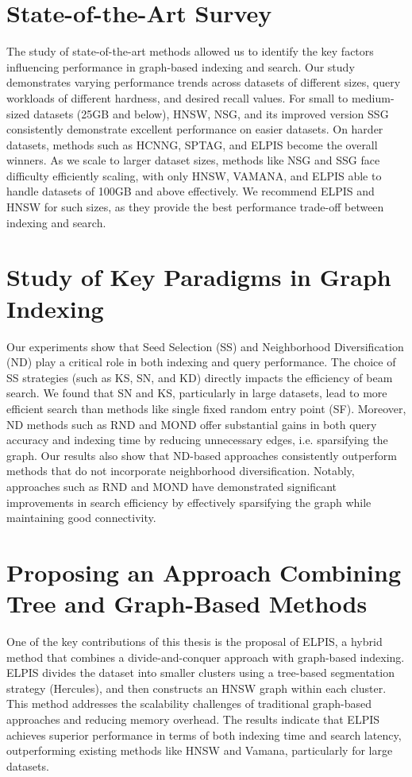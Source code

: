 \section{State-of-the-Art Survey}
The study of state-of-the-art methods allowed us to identify the key factors influencing performance in graph-based indexing and search. Our study demonstrates varying performance trends across datasets of different sizes, query workloads of different hardness, and desired recall values. For small to medium-sized datasets (25GB and below), HNSW, NSG, and its improved version SSG consistently demonstrate excellent performance on easier datasets. On harder datasets, methods such as HCNNG, SPTAG, and ELPIS become the overall winners. As we scale to larger dataset sizes, methods like NSG and SSG face difficulty efficiently scaling, with only HNSW, VAMANA, and ELPIS able to handle datasets of 100GB and above effectively. We recommend ELPIS and HNSW for such sizes, as they provide the best performance trade-off between indexing and search.

\section{Study of Key Paradigms in Graph Indexing}
Our experiments show that Seed Selection (SS) and Neighborhood Diversification (ND) play a critical role in both indexing and query performance. The choice of SS strategies (such as KS, SN, and KD) directly impacts the efficiency of beam search. We found that SN and KS, particularly in large datasets, lead to more efficient search than methods like single fixed random entry point (SF). Moreover, ND methods such as RND and MOND offer substantial gains in both query accuracy and indexing time by reducing unnecessary edges, i.e. sparsifying the graph. Our results also show that ND-based approaches consistently outperform methods that do not incorporate neighborhood diversification. Notably, approaches such as RND and MOND have demonstrated significant improvements in search efficiency by effectively sparsifying the graph while maintaining good connectivity.

\section{Proposing an Approach Combining Tree and Graph-Based Methods}
One of the key contributions of this thesis is the proposal of ELPIS, a hybrid method that combines a divide-and-conquer approach with graph-based indexing. ELPIS divides the dataset into smaller clusters using a tree-based segmentation strategy (Hercules), and then constructs an HNSW graph within each cluster. This method addresses the scalability challenges of traditional graph-based approaches and reducing memory overhead. The results indicate that ELPIS achieves superior performance in terms of both indexing time and search latency, outperforming existing methods like HNSW and Vamana, particularly for large datasets.

